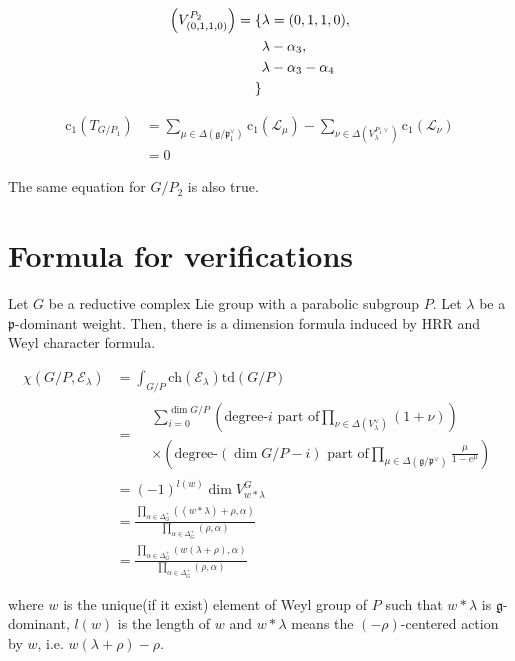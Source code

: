 \documentclass[uplatex,dvipdfmx]{jsarticle}
\newcommand{\ch}[1]{\mathrm{ch}\left( {#1} \right)}
\newcommand{\td}[1]{\mathrm{td}\left( {#1} \right)}
\begin{document}
\begin{equation}
    \begin{alignedat}
        \Delta\left( V^{P_2}_{(0, 1, 1, 0)} \right)
        =
        \{
            &\lambda = (0, 1, 1, 0),\\
            &\lambda - \alpha_3,\\
            &\lambda - \alpha_3 - \alpha_4\\
        \}
    \end{alignedat}
\end{equation}

\begin{align}
    \mathrm{c}_1(T_{G/P_1})
    &=
    \sum_{\mu \in \Delta(\mathfrak{g}/\mathfrak{p}_1^\vee)}\mathrm{c}_1(\mathcal{L}_\mu)
    -
    \sum_{\nu \in \Delta(V^{P_1\vee}_\lambda)}\mathrm{c}_1(\mathcal{L}_\nu)\\
    &=
    0
\end{align}

The same equation for
$G/P_2$
is also true.


\section{Formula for verifications}

Let
$G$
be a reductive complex Lie group with a parabolic subgroup
$P$.
Let
$\lambda$
be a
$\mathfrak{p}$-dominant
weight.
Then, there is a dimension formula 
induced by HRR and Weyl character formula.

\begin{align}
    \chi \left( G/P, \mathcal{E}_\lambda \right)
    &=
    \int_{G/P}
    \ch{\mathcal{E}_\lambda}
    \td{G/P}\\
    &=
    \begin{split}
        &\sum_{i = 0}^{\operatorname{dim} G/P}
        (\text{degree-$i$ part of} 
        \prod_{\nu \in \Delta(V_\lambda^\vee)}(1 + \nu))\\
        &\times (\text{degree-$(\operatorname{dim} G/P - i)$ part of}
        \prod_{\mu \in \Delta(\mathfrak{g}/\mathfrak{p}^\vee)}
        \frac{\mu}{1 - e^\mu})
    \end{split}\\
    &=
    (-1)^{l(w)}\operatorname{dim} V^G_{w * \lambda}\\
    &=
    \frac
    {\prod_{\alpha \in \Delta_G^+}((w*\lambda) + \rho, \alpha)}
    {\prod_{\alpha \in \Delta_G^+}(\rho, \alpha)}\\
    &=
    \frac
    {\prod_{\alpha \in \Delta_G^+}(w(\lambda + \rho), \alpha)}
    {\prod_{\alpha \in \Delta_G^+}(\rho, \alpha)}
\end{align}

where
$w$
is the unique(if it exist) element of Weyl group of
$P$
such that
$w * \lambda$
is
$\mathfrak{g}$-dominant,
$l(w)$
is the length of
$w$
and
$w *\lambda$
means the
$(-\rho)$-centered
action by
$w$,
i.e.
$w(\lambda + \rho) - \rho$.
\end{document}
